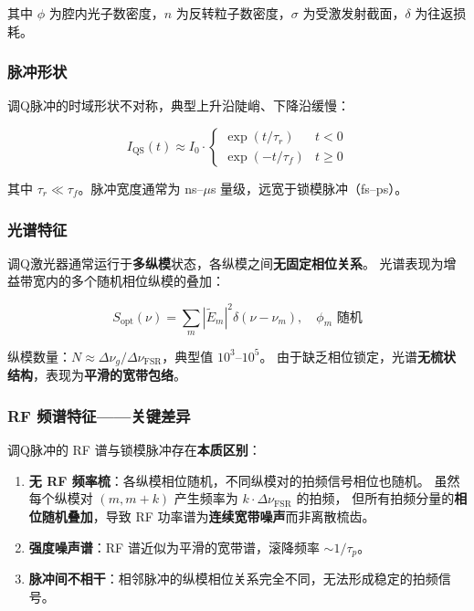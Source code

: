 \documentclass[11pt,a4paper]{article}
\begin{document}
其中 $\phi$ 为腔内光子数密度，$n$ 为反转粒子数密度，$\sigma$ 为受激发射截面，$\delta$ 为往返损耗。

\subsubsection{脉冲形状}

调Q脉冲的时域形状不对称，典型上升沿陡峭、下降沿缓慢：

\begin{equation}\label{eq:qswitch_shape}
I_{\text{QS}}(t) \approx I_0 \cdot \begin{cases}
\exp(t/\tau_r) & t < 0 \\
\exp(-t/\tau_f) & t \geq 0
\end{cases}
\end{equation}

其中 $\tau_r \ll \tau_f$。脉冲宽度通常为 ns--$\mu$s 量级，远宽于锁模脉冲（fs--ps）。

\subsubsection{光谱特征}

调Q激光器通常运行于\textbf{多纵模}状态，各纵模之间\textbf{无固定相位关系}。
光谱表现为增益带宽内的多个随机相位纵模的叠加：

\begin{equation}\label{eq:qswitch_spectrum}
S_{\text{opt}}(\nu) = \sum_{m} |\tilde{E}_m|^2 \delta(\nu - \nu_m), \quad \phi_m \text{ 随机}
\end{equation}

纵模数量：$N \approx \Delta \nu_g / \Delta \nu_{\text{FSR}}$，典型值 $10^3$--$10^5$。
由于缺乏相位锁定，光谱\textbf{无梳状结构}，表现为\textbf{平滑的宽带包络}。

\subsubsection{RF 频谱特征——关键差异}

调Q脉冲的 RF 谱与锁模脉冲存在\textbf{本质区别}：

\begin{enumerate}[label=(\arabic*)]
    \item \textbf{无 RF 频率梳}：各纵模相位随机，不同纵模对的拍频信号相位也随机。
    虽然每个纵模对 $(m, m+k)$ 产生频率为 $k \cdot \Delta \nu_{\text{FSR}}$ 的拍频，
    但所有拍频分量的\textbf{相位随机叠加}，导致 RF 功率谱为\textbf{连续宽带噪声}而非离散梳齿\cite{Vasilev1988}。

    \item \textbf{强度噪声谱}：RF 谱近似为平滑的宽带谱，滚降频率 $\sim 1/\tau_p$。

    \item \textbf{脉冲间不相干}：相邻脉冲的纵模相位关系完全不同，无法形成稳定的拍频信号。
\end{enumerate}
\end{document}
